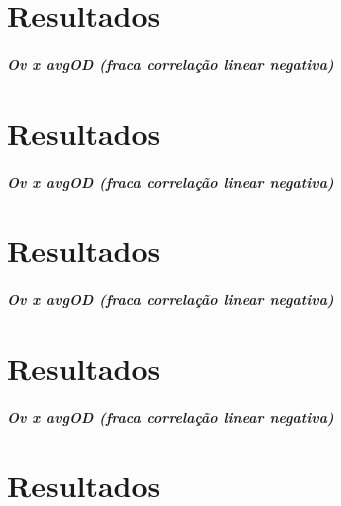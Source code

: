 \section*{Resultados}

\subparagraph*{Ov x avg\+OD (fraca correlação linear negativa)}

\subsection*{}





\section*{Resultados}

\subparagraph*{Ov x avg\+OD (fraca correlação linear negativa)}

\subsection*{}





\section*{Resultados}

\subparagraph*{Ov x avg\+OD (fraca correlação linear negativa)}

\subsection*{}





\section*{Resultados}

\subparagraph*{Ov x avg\+OD (fraca correlação linear negativa)}

\subsection*{}





\section*{Resultados}

